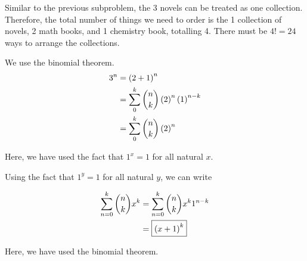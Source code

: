 \documentclass{article}
\begin{document}
\vspace{-4\parskip}
\subproblema{}
Similar to the previous subproblem, the 3 novels can be treated as one collection.
Therefore, the total number of things we need to order is the 1 collection of novels, 2 math books, and 1 chemistry book, totalling 4. There must be $4! = \boxed{24}$ ways to arrange the collections.

\setcounter{problem}{25}
\problem{}
\subproblema{}

We use the binomial theorem.
\begin{align*}
  3^n &= \left (2 + 1 \right)^n \\
      &= \sum \limits_{0}^{k} \binom{n}{k} \left (2 \right)^n \left (1 \right)^{n-k} \\
      &= \sum \limits_{0}^{k} \binom{n}{k} \left (2 \right)^n \\
\end{align*}

Here, we have used the fact that $1^x = 1$ for all natural $x$.

\vspace{-4\parskip}
\subproblema{}

Using the fact that $1^{y} = 1$ for all natural $y$, we can write

\begin{align*}
  \sum \limits_{n=0}^{k} \binom{n}{k} x^k &= \sum \limits_{n=0}^{k} \binom{n}{k} x^k 1^{n-k} \\
                                          &= \boxed{\left (x+1 \right)^k} \\
\end{align*}

Here, we have used the binomial theorem.
\end{document}
